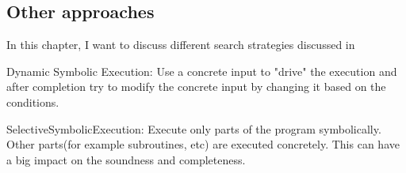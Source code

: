 \subsection{Other approaches}
In this chapter, I want to discuss different search strategies discussed in \cite{SurveySymExec-CSUR18}

Dynamic Symbolic Execution: Use a concrete input to "drive" the execution and after completion try to modify the concrete input by changing it based on the conditions. \cite{Godefroid:2005:DDA:1064978.1065036}

SelectiveSymbolicExecution: Execute only parts of the program symbolically. Other parts(for example subroutines, etc) are executed concretely. This can have a big impact on the soundness and completeness. \cite{Chipounov:2012:SPD:2110356.2110358}

